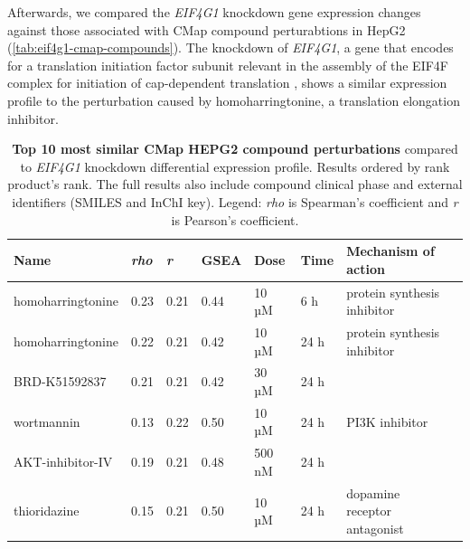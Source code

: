 Afterwards, we compared the \emph{EIF4G1} knockdown gene expression changes against those associated with CMap compound perturabtions in HepG2 (\autoref{tab:eif4g1-cmap-compounds}). The knockdown of \emph{EIF4G1}, a gene that encodes for a translation initiation factor subunit relevant in the assembly of the EIF4F complex for initiation of cap-dependent translation \cite{tu:2010vi,jaiswal:2018uq,luo:2019tp}, shows a similar expression profile to the perturbation caused by homoharringtonine, a translation elongation inhibitor.

\begin{table}[!h]
\centering
\footnotesize
\caption[Top 10 CMap HEPG2 compound perturbations]{\textbf{Top 10 most similar CMap HEPG2 compound perturbations} compared to \emph{EIF4G1} knockdown differential expression profile. Results ordered by rank product's rank. The full results also include compound clinical phase and external identifiers (SMILES and InChI key). Legend: \emph{rho} is Spearman's coefficient and \emph{r} is Pearson's coefficient.}
\label{tab:eif4g1-cmap-compounds}
\begin{tabular}{llllllll}
\toprule
\textbf{Name}     & \textbf{\emph{rho}} & \textbf{\emph{r}} & \textbf{GSEA} & \textbf{Dose} & \textbf{Time} & \textbf{Mechanism of action} \\
\midrule
homoharringtonine & 0.23                           & 0.21                           & 0.44          & 10 µM         & 6 h                & protein synthesis inhibitor  \\
homoharringtonine & 0.22                           & 0.21                           & 0.42          & 10 µM         & 24 h               & protein synthesis inhibitor  \\
BRD-K51592837     & 0.21                           & 0.21                           & 0.42          & 30 µM         & 24 h               &                              \\
wortmannin        & 0.13                           & 0.22                           & 0.50          & 10 µM         & 24 h               & PI3K inhibitor               \\
AKT-inhibitor-IV  & 0.19                           & 0.21                           & 0.48          & 500 nM        & 24 h               &                              \\
thioridazine      & 0.15                           & 0.21                           & 0.50          & 10 µM         & 24 h               & dopamine receptor antagonist \\

\end{tabular}
\end{table}
